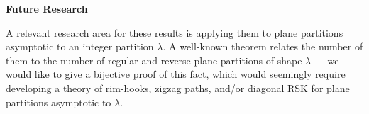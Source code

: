 \vspace{.25in}

\Large \textbf{Future Research}\\

\normalsize

A relevant research area for these results is applying them to plane partitions asymptotic to an integer partition $\lambda$. A well-known theorem relates the number of them to the number of regular and reverse plane partitions of shape $\lambda$ --- we would like to give a bijective proof of this fact, which would seemingly require developing a theory of rim-hooks, zigzag paths, and/or diagonal RSK for plane partitions asymptotic to $\lambda$.





